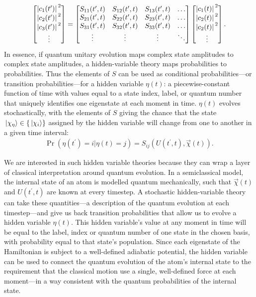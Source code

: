 \begin{align}
\left[\begin{matrix}
\abs{c_1(t^\prime)}^2\\\abs{c_2(t^\prime)}^2\\\abs{c_3(t^\prime)}^2\\\vdots
\end{matrix}\right]
= \left[\begin{matrix}
S_{11}(t^\prime, t) & S_{12}(t^\prime, t) & S_{13}(t^\prime, t)&\hdots\\
S_{21}(t^\prime, t) & S_{22}(t^\prime, t) & S_{23}(t^\prime, t)&\hdots\\
S_{31}(t^\prime, t) & S_{32}(t^\prime, t) & S_{33}(t^\prime, t)&\hdots\\
\vdots & \vdots & \vdots & \ddots
\end{matrix}\right]
\left[\begin{matrix}
\abs{c_1(t)}^2\\\abs{c_2(t)}^2\\\abs{c_2(t)}^2\\\vdots
\end{matrix}\right].
\end{align}
In essence, if quantum unitary evolution maps complex state amplitudes to complex state amplitudes, a hidden-variable theory maps probabilities to probabilities. Thus the elements of $S$ can be used as conditional probabilities---or transition probabilities---for a hidden variable $\eta(t)$: a piecewise-constant function of time with values equal to a state index, label, or quantum number that uniquely identifies one eigenstate at each moment in time. $\eta(t)$ evolves stochastically, with the elements of $S$ giving the chance that the state $\ket{\chi_\eta} \in \{\ket{\chi_i}\}$ assigned by the hidden variable will change from one to another in a given time interval:
\begin{align}\label{eq:conditional_probability}
\Pr(\eta(t^\prime){=}i|\eta(t){=}j) = S_{ij}(U(t^\prime, t), \vec\chi(t)).
\end{align}

We are interested in such hidden variable theories because they can wrap a layer of classical interpretation around quantum evolution. In a semiclassical model, the internal state of an atom is modelled quantum mechanically, such that $\vec\chi(t)$ and $U(t^\prime, t)$ are known at every timestep. A stochastic hidden-variable theory can take these quantities---a description of the quantum evolution at each timestep---and give us back transition probabilities that allow us to evolve a hidden variable $\eta(t)$. This hidden variable's value at any moment in time will be equal to the label, index or quantum number of one state in the chosen basis, with probability equal to that state's population. Since each eigenstate of the Hamiltonian is subject to a well-defined adiabatic potential, the hidden variable can be used to connect the quantum evolution of the atom's internal state to the requirement that the classical motion use a single, well-defined force at each moment---in a way consistent with the quantum probabilities of the internal state.

